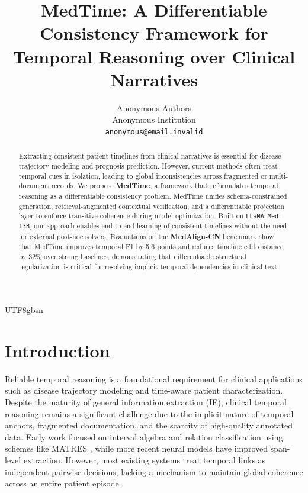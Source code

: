 \documentclass[11pt]{article}
\title{MedTime: A Differentiable Consistency Framework for \\ Temporal Reasoning over Clinical Narratives}
\author{Anonymous Authors \\
  Anonymous Institution \\
  \texttt{anonymous@email.invalid} \\}
\begin{document}
\begin{CJK*}{UTF8}{gbsn}
\maketitle

\begin{abstract}
Extracting consistent patient timelines from clinical narratives is essential for disease trajectory modeling and prognosis prediction. However, current methods often treat temporal cues in isolation, leading to global inconsistencies across fragmented or multi-document records. We propose \textbf{MedTime}, a framework that reformulates temporal reasoning as a differentiable consistency problem. MedTime unifies schema-constrained generation, retrieval-augmented contextual verification, and a differentiable projection layer to enforce transitive coherence during model optimization. Built on \texttt{LLaMA-Med-13B}, our approach enables end-to-end learning of consistent timelines without the need for external post-hoc solvers. Evaluations on the \textbf{MedAlign-CN} benchmark show that MedTime improves temporal F1 by 5.6 points and reduces timeline edit distance by 32\% over strong baselines, demonstrating that differentiable structural regularization is critical for resolving implicit temporal dependencies in clinical text.
\end{abstract}

\section{Introduction}

Reliable temporal reasoning is a foundational requirement for clinical applications such as disease trajectory modeling and time-aware patient characterization. Despite the maturity of general information extraction (IE), clinical temporal reasoning remains a significant challenge due to the implicit nature of temporal anchors, fragmented documentation, and the scarcity of high-quality annotated data. Early work focused on interval algebra \cite{allen1983maintaining} and relation classification using schemes like MATRES \cite{ning2019matres}, while more recent neural models \cite{lin2020joint,wang2022mlee} have improved span-level extraction. However, most existing systems treat temporal links as independent pairwise decisions, lacking a mechanism to maintain global coherence across an entire patient episode.


\end{CJK*}
\end{document}
